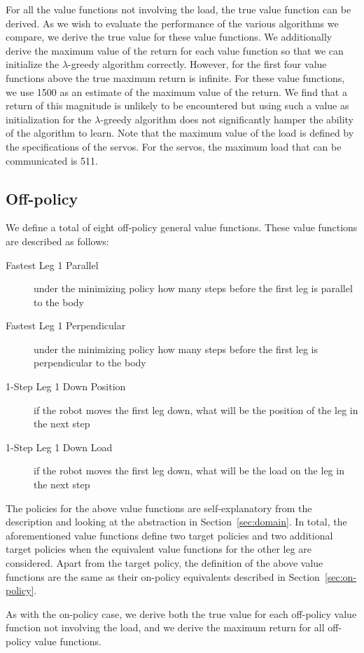 \documentclass[../main.tex]{subfiles}
\begin{document}
For all the value functions not involving the load, the true value function can be derived. As we wish to evaluate the performance of the various algorithms we compare, we derive the true value for these value functions. We additionally derive the maximum value of the return for each value function so that we can initialize the $\lambda$-greedy algorithm correctly. However, for the first four value functions above the true maximum return is infinite. For these value functions, we use 1500 as an estimate of the maximum value of the return. We find that a return of this magnitude is unlikely to be encountered but using such a value as initialization for the $\lambda$-greedy algorithm does not significantly hamper the ability of the algorithm to learn. Note that the maximum value of the load is defined by the specifications of the servos. For the servos, the maximum load that can be communicated is 511.

\subsection{Off-policy}
\label{sec:off-policy}

We define a total of eight off-policy \cite{sutton1998reinforcement} general value functions. These value functions are described as follows:

\begin{description}
    \item[Fastest Leg 1 Parallel] under the minimizing policy how many steps before the first leg is parallel to the body
    \item[Fastest Leg 1 Perpendicular] under the minimizing policy how many steps before the first leg is perpendicular to the body
    \item[1-Step Leg 1 Down Position] if the robot moves the first leg down, what will be the position of the leg in the next step
    \item[1-Step Leg 1 Down Load] if the robot moves the first leg down, what will be the load on the leg in the next step
\end{description}

The policies for the above value functions are self-explanatory from the description and looking at the abstraction in Section~\ref{sec:domain}. In total, the aforementioned value functions define two target policies and two additional target policies when the equivalent value functions for the other leg are considered. Apart from the target policy, the definition of the above value functions are the same as their on-policy equivalents described in Section~\ref{sec:on-policy}.

As with the on-policy case, we derive both the true value for each off-policy value function not involving the load, and we derive the maximum return for all off-policy value functions.
\end{document}
